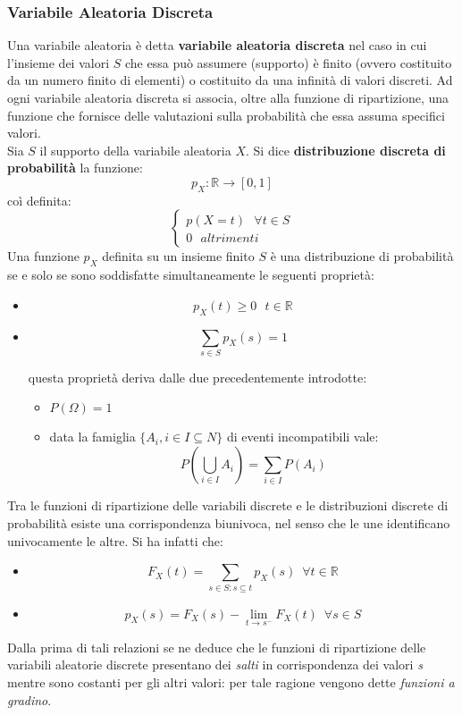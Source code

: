 \documentclass[a4paper,12pt, oneside]{book}
\begin{document}
\subsubsection{Variabile Aleatoria Discreta}
Una variabile aleatoria è detta \textbf{variabile aleatoria discreta} nel caso in cui
l'insieme dei valori $S$ che essa può assumere (supporto) è finito (ovvero costituito
da un numero finito di elementi) o costituito da una infinità di valori discreti. Ad ogni variabile aleatoria discreta si associa, oltre alla funzione di ripartizione, una funzione che fornisce delle valutazioni sulla probabilità che essa assuma specifici valori.\\
Sia $S$ il supporto della variabile aleatoria $X$. Si dice \textbf{distribuzione discreta di probabilità} la funzione:
\[p_X:\mathbb{R}\to[0,1]\]
coì definita:
\[
\begin{cases}
p(X=t)\,\,\,\,  \forall t\in S\\
0\,\,\,\,  altrimenti
\end{cases}
\]
Una funzione $p_X$ definita su un insieme finito $S$ è una distribuzione di probabilità se e solo se sono soddisfatte simultaneamente le seguenti proprietà:
\begin{itemize}
\item \[p_X(t)\geq 0\,\,\,\, t\in \mathbb{R}\]
\item \[\sum_{s\in S} p_X(s)=1\]

\newpage
questa proprietà deriva dalle due precedentemente introdotte:
\begin{itemize}
\item $P(\Omega)=1$
\item data la famiglia $\{A_i,i\in I\subseteq N\}$ 
di eventi incompatibili vale:
\[P(\bigcup_{i\in I} A_i)=\sum_{i\in I} P(A_i)\]
\end{itemize}
\end{itemize}
Tra le funzioni di ripartizione delle variabili discrete e le distribuzioni discrete di
probabilità esiste una corrispondenza biunivoca, nel senso che le une identificano
univocamente le altre. Si ha infatti che:
\begin{itemize}
\item \[F_X(t)=\sum_{s\in S:s\subseteq t} p_X(s)\,\,\, \forall t\in \mathbb{R}\]
\item \[p_X(s)=F_X(s)-\lim_{t\to s^{-}} F_X(t)\,\,\, \forall s\in S\]
\end{itemize}
Dalla prima di tali relazioni se ne deduce che le funzioni di ripartizione delle variabili
aleatorie discrete presentano dei \textit{salti} in corrispondenza dei valori \textit{s} mentre
sono costanti per gli altri valori: per tale ragione vengono dette \textit{funzioni a gradino}.
\end{document}
